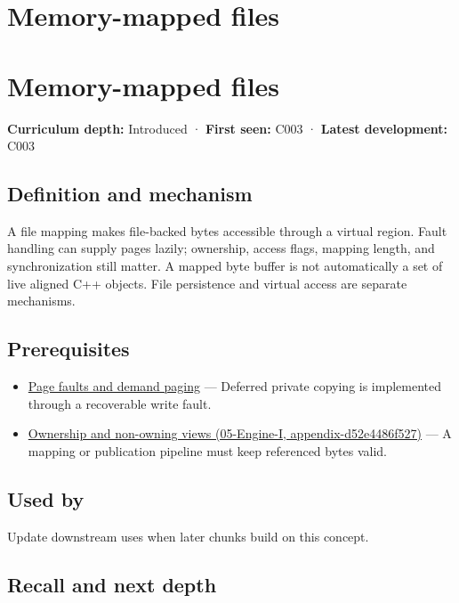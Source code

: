 \hypertarget{appendix-313ee7a0ba7b}{}
\section*{Memory-mapped files}
\section{Memory-mapped files}\label{appendix-313ee7a0ba7b-memory-mapped-files}

\textbf{Curriculum depth:} Introduced · \textbf{First seen:} C003 · \textbf{Latest development:} C003

\subsection{Definition and mechanism}\label{appendix-313ee7a0ba7b-definition-and-mechanism}

A file mapping makes file-backed bytes accessible through a virtual region. Fault handling can supply pages lazily; ownership, access flags, mapping length, and synchronization still matter. A mapped byte buffer is not automatically a set of live aligned C++ objects. File persistence and virtual access are separate mechanisms.

\subsection{Prerequisites}\label{appendix-313ee7a0ba7b-prerequisites}

\begin{itemize}
\tightlist
\item
  \hyperref[appendix-cc0909a7ef14]{Page faults and demand paging} --- Deferred private copying is implemented through a recoverable write fault.
\item
  \href{../05-Engine-I/main.pdf\#nameddest=appendix-d52e4486f527}{Ownership and non-owning views (05-Engine-I, appendix-d52e4486f527)} --- A mapping or publication pipeline must keep referenced bytes valid.
\end{itemize}

\subsection{Used by}\label{appendix-313ee7a0ba7b-used-by}

Update downstream uses when later chunks build on this concept.

\subsection{Recall and next depth}\label{appendix-313ee7a0ba7b-recall-and-next-depth}

